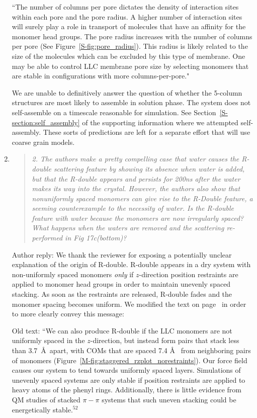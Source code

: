 \documentclass{article}
\begin{document}
\begin{enumerate}
    ``The number of columns per pore dictates the density of interaction sites
    within each pore and the pore radius. A higher number of interaction sites will
    surely play a role in transport of molecules that have an affinity for the
    monomer head groups.  The pore radius increases with the number of columns per
    pore (See Figure~\ref{S-fig:pore_radius}). This radius is likely related to the
    size of the molecules which can be excluded by this type of membrane. One may be
    able to control LLC membrane pore size by selecting monomers that are stable in
    configurations with more columns-per-pore."
    
    We are unable to definitively answer the question of whether the 5-column 
    structures are most likely to assemble in solution phase. The system does
    not self-assemble on a timescale reasonable for simulation. See 
    Section~\ref{S-section:self_assembly} of the supporting information where
    we attempted self-assembly. These sorts of predictions are left for 
    a separate effort that will use coarse grain models.
    
    \item \begin{quote}
    \textit{2. The authors make a pretty compelling case that water causes the
    R-double scattering feature by showing its absence when water is added, but
    that the R-double appears and persists for 200ns after the water makes its way
    into the crystal. However, the authors also show that nonuniformly spaced
    monomers can give rise to the R-Double feature, a seeming counterexample to the
    necessity of water.  Is the R-double feature with water because the monomers
    are now irregularly spaced? What happens when the waters are removed and the
    scattering re-performed in Fig 17c(bottom)?}
    \end{quote}
    
    Author reply: We thank the reviewer for exposing a potentially unclear
    explanation of the origin of R-double. R-double appears in a dry system with
    non-uniformly spaced monomers \textit{only} if $z$-direction position
    restraints are applied to monomer head groups in order to maintain unevenly
    spaced stacking. As soon as the restraints are released, R-double fades and the
    monomer spacing becomes uniform. We modified the text on page~\pageref{M-modification:rdouble}
    in order to more clearly convey this message:
 
    Old text: ``We can also produce R-double if the LLC monomers are not
    uniformly spaced in the $z$-direction, but instead form pairs that stack less
    than 3.7~\AA~apart, with COMs that are spaced 7.4 \AA~ from neighboring pairs
    of monomers (Figure~\ref{M-fig:staggered_rzplot_norestraints}). Our force field
    causes our system to tend towards uniformly spaced layers. Simulations of
    unevenly spaced systems are only stable if position restraints are applied to
    heavy atoms of the phenyl rings. Additionally, there is little evidence from QM
    studies of stacked $\pi-\pi$ systems that such uneven stacking could be
    energetically stable.$^{52}$%


\end{enumerate}
\end{document}
